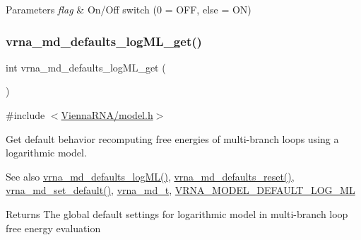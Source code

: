 \begin{DoxyParams}{Parameters}
{\em flag} & On/\+Off switch (0 = O\+FF, else = ON) \\
\hline
\end{DoxyParams}
\mbox{\label{group__model__details_ga93f04e070d529c5d0bb87c9681f6ad29}} 
\subsubsection{\texorpdfstring{vrna\+\_\+md\+\_\+defaults\+\_\+log\+M\+L\+\_\+get()}{vrna\_md\_defaults\_logML\_get()}}
{\footnotesize\ttfamily int vrna\+\_\+md\+\_\+defaults\+\_\+log\+M\+L\+\_\+get (\begin{DoxyParamCaption}\item[{void}]{ }\end{DoxyParamCaption})}



{\ttfamily \#include $<$\mbox{\hyperlink{model_8h}{Vienna\+R\+N\+A/model.\+h}}$>$}



Get default behavior recomputing free energies of multi-\/branch loops using a logarithmic model. 

\begin{DoxySeeAlso}{See also}
\mbox{\hyperlink{group__model__details_ga3de50a73455d88c3957386933b8e1f90}{vrna\+\_\+md\+\_\+defaults\+\_\+log\+M\+L()}}, \mbox{\hyperlink{group__model__details_ga70834424cf804d149937de89f80ceb45}{vrna\+\_\+md\+\_\+defaults\+\_\+reset()}}, \mbox{\hyperlink{group__model__details_ga8ac6ff84936282436f822644bf841f66}{vrna\+\_\+md\+\_\+set\+\_\+default()}}, \mbox{\hyperlink{group__model__details_ga1f8a10e12a0a1915f2a4eff0b28ea17c}{vrna\+\_\+md\+\_\+t}}, \mbox{\hyperlink{group__model__details_ga938f68463e84fe060aa6502f428a517d}{V\+R\+N\+A\+\_\+\+M\+O\+D\+E\+L\+\_\+\+D\+E\+F\+A\+U\+L\+T\+\_\+\+L\+O\+G\+\_\+\+ML}} 
\end{DoxySeeAlso}
\begin{DoxyReturn}{Returns}
The global default settings for logarithmic model in multi-\/branch loop free energy evaluation 
\end{DoxyReturn}
\mbox{\label{group__model__details_ga4e1deb3e91a8a99e5c6dd905a5eb0186}} 

